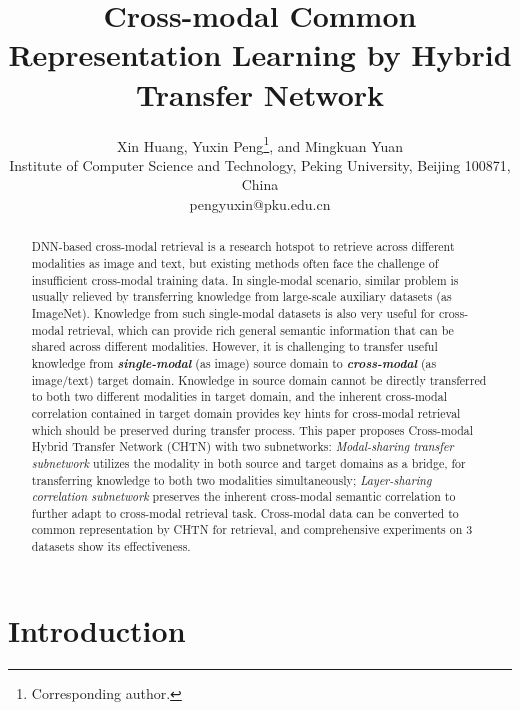 \documentclass{article}
\title{Cross-modal Common Representation Learning by Hybrid Transfer Network}
\author{Xin Huang, Yuxin Peng\thanks{Corresponding author.},  \textmd{and} Mingkuan Yuan \\ 
Institute of Computer Science and Technology, 
Peking University, Beijing 100871, China \\
pengyuxin@pku.edu.cn}
\begin{document}
\maketitle

\begin{abstract}
DNN-based cross-modal retrieval is a research hotspot to retrieve across different modalities as image and text, but existing methods often face the challenge of insufficient cross-modal training data. In single-modal scenario, similar problem is usually relieved by transferring knowledge from large-scale auxiliary datasets (as ImageNet). 
Knowledge from such single-modal datasets is also very useful for cross-modal retrieval, which can provide rich general semantic information that can be shared across different modalities.
However, it is challenging to transfer useful knowledge from \textbf{\emph{single-modal}} (as image) source domain to \textbf{\emph{cross-modal}} (as image/text) target domain. 
Knowledge in source domain cannot be directly transferred to both two different modalities in target domain, and the inherent cross-modal correlation contained in target domain provides key hints for cross-modal retrieval which should be preserved during transfer process. 
This paper proposes Cross-modal Hybrid Transfer Network (CHTN) with two subnetworks: \emph{Modal-sharing transfer subnetwork} utilizes the modality in both source and target domains as a bridge, for transferring knowledge to both two modalities simultaneously; \emph{Layer-sharing correlation subnetwork} preserves the inherent cross-modal semantic correlation to further adapt to cross-modal retrieval task. Cross-modal data can be converted to common representation by CHTN for retrieval, and comprehensive experiments on 3 datasets show its effectiveness.

\end{abstract}


\section{Introduction}
\end{document}
